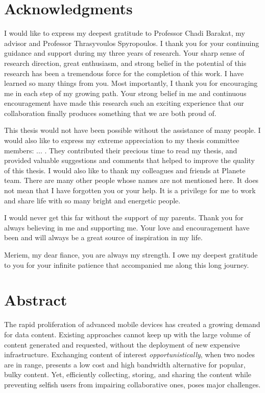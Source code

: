 \documentclass[a4paper,11pt,twoside]{ThesisStyle}
\begin{document}


\dominitoc


\cleardoublepage

\section*{Acknowledgments}

I would like to express my deepest gratitude to Professor Chadi Barakat, my advisor and Professor Thrasyvoulos Spyropoulos. I thank you for your continuing guidance and support during my three years of research. Your sharp sense of research direction, great enthusiasm, and strong belief in the potential of this research has been a tremendous force for the completion of this work. I have learned so many things from you. Most importantly, I thank you for encouraging me in each step of my growing path. Your strong belief in me and continuous encouragement have made this research such an exciting experience that our collaboration finally produces something that we are both proud of.

This thesis would not have been possible without the assistance of many people. I would also like to express my extreme appreciation to my thesis committee members: ... . They contributed their precious time to read my thesis, and provided valuable suggestions and comments that helped to improve the quality of this thesis. I would also like to thank my colleagues and friends at Planete team. There are many other people whose names are not mentioned here. It does not mean that I have forgotten you or your help. It is a privilege for me to work and share life with so many bright and energetic people. 

I would never get this far without the support of my parents. Thank you for always believing in me and supporting me. Your love and encouragement have been and will always be a great source of inspiration in my life.  

Meriem, my dear fiance, you are always my strength. I owe my deepest gratitude to you for your infinite patience that accompanied me along this long journey.

\cleardoublepage

\section*{Abstract}
The rapid proliferation of advanced mobile devices has created a growing demand for data content. Existing approaches cannot keep up with the large volume of content generated and requested, without the deployment of new expensive infrastructure. Exchanging content of interest \emph{opportunistically}, when two nodes are in range, presents a low cost and high bandwidth alternative for popular, bulky content. Yet, efficiently collecting, storing, and sharing the content while preventing selfish users from impairing collaborative ones, poses major challenges.
\end{document}
